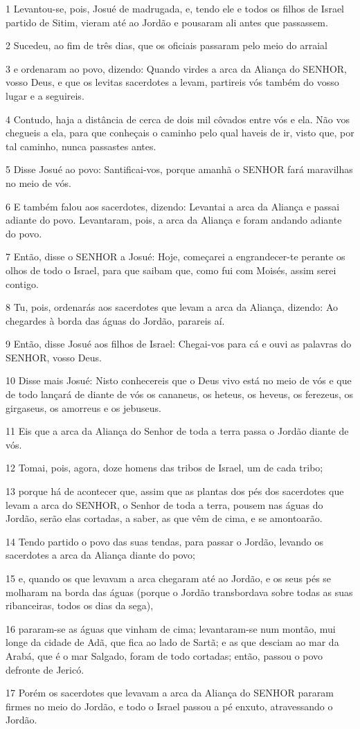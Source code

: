 \par 1 Levantou-se, pois, Josué de madrugada, e, tendo ele e todos os filhos de Israel partido de Sitim, vieram até ao Jordão e pousaram ali antes que passassem.
\par 2 Sucedeu, ao fim de três dias, que os oficiais passaram pelo meio do arraial
\par 3 e ordenaram ao povo, dizendo: Quando virdes a arca da Aliança do SENHOR, vosso Deus, e que os levitas sacerdotes a levam, partireis vós também do vosso lugar e a seguireis.
\par 4 Contudo, haja a distância de cerca de dois mil côvados entre vós e ela. Não vos chegueis a ela, para que conheçais o caminho pelo qual haveis de ir, visto que, por tal caminho, nunca passastes antes.
\par 5 Disse Josué ao povo: Santificai-vos, porque amanhã o SENHOR fará maravilhas no meio de vós.
\par 6 E também falou aos sacerdotes, dizendo: Levantai a arca da Aliança e passai adiante do povo. Levantaram, pois, a arca da Aliança e foram andando adiante do povo.
\par 7 Então, disse o SENHOR a Josué: Hoje, começarei a engrandecer-te perante os olhos de todo o Israel, para que saibam que, como fui com Moisés, assim serei contigo.
\par 8 Tu, pois, ordenarás aos sacerdotes que levam a arca da Aliança, dizendo: Ao chegardes à borda das águas do Jordão, parareis aí.
\par 9 Então, disse Josué aos filhos de Israel: Chegai-vos para cá e ouvi as palavras do SENHOR, vosso Deus.
\par 10 Disse mais Josué: Nisto conhecereis que o Deus vivo está no meio de vós e que de todo lançará de diante de vós os cananeus, os heteus, os heveus, os ferezeus, os girgaseus, os amorreus e os jebuseus.
\par 11 Eis que a arca da Aliança do Senhor de toda a terra passa o Jordão diante de vós.
\par 12 Tomai, pois, agora, doze homens das tribos de Israel, um de cada tribo;
\par 13 porque há de acontecer que, assim que as plantas dos pés dos sacerdotes que levam a arca do SENHOR, o Senhor de toda a terra, pousem nas águas do Jordão, serão elas cortadas, a saber, as que vêm de cima, e se amontoarão.
\par 14 Tendo partido o povo das suas tendas, para passar o Jordão, levando os sacerdotes a arca da Aliança diante do povo;
\par 15 e, quando os que levavam a arca chegaram até ao Jordão, e os seus pés se molharam na borda das águas (porque o Jordão transbordava sobre todas as suas ribanceiras, todos os dias da sega),
\par 16 pararam-se as águas que vinham de cima; levantaram-se num montão, mui longe da cidade de Adã, que fica ao lado de Sartã; e as que desciam ao mar da Arabá, que é o mar Salgado, foram de todo cortadas; então, passou o povo defronte de Jericó.
\par 17 Porém os sacerdotes que levavam a arca da Aliança do SENHOR pararam firmes no meio do Jordão, e todo o Israel passou a pé enxuto, atravessando o Jordão.

